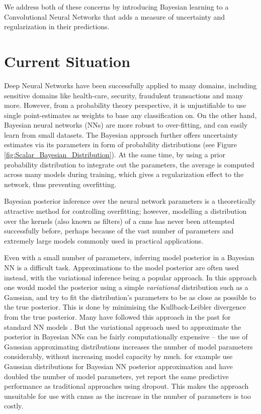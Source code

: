 We address both of these concerns by introducing Bayesian learning to a Convolutional Neural Networks that adds a measure of uncertainty and regularization in their predictions. 

\section{Current Situation}

Deep Neural Networks have been successfully applied to many domains, including sensitive domains like health-care, security, fraudulent transactions and many more. However, from a probability theory perspective, it is unjustifiable to use single point-estimates as weights to base any classification on.
On the other hand, Bayesian neural networks (NNs) are more robust to over-fitting, and can easily learn from small datasets. The Bayesian approach further offers uncertainty estimates via its parameters in form of probability distributions (see Figure \ref{fig:Scalar_Bayesian_Distribution}). At the same time, by using a prior probability distribution to integrate out the parameters, the average is computed across many models during training, which gives a regularization effect to the network, thus preventing overfitting.


Bayesian posterior inference over the neural network parameters is a theoretically attractive method for controlling overfitting; however, modelling a distribution over the kernels (also known as filters) of a \acp{cnn} has never been attempted successfully before, perhaps because of the vast number of parameters and extremely large models commonly used in practical applications.

Even with a small number of parameters, inferring model posterior in a Bayesian NN is a difficult task. Approximations to the model posterior are often used instead, with the variational inference being a popular approach. In this approach one would model the posterior using a simple \textit{variational} distribution such as a Gaussian, and try to fit the distribution's parameters to be as close as possible to the true posterior. This is done by minimising the Kullback-Leibler divergence from the true posterior. Many have followed this approach in the past for standard NN models \citep{hinton1993keeping,barber1998ensemble,graves2011practical,blundell2015weight}.
But the variational approach used to approximate the posterior in Bayesian NNs can be fairly computationally expensive -- the use of Gaussian approximating distributions increases the number of model parameters considerably, without increasing model capacity by much. \citet{blundell2015weight} for example use Gaussian distributions for Bayesian NN posterior approximation and have doubled the number of model parameters, yet report the same predictive performance as traditional approaches using dropout. This makes the approach unsuitable for use with \acp{cnn}s as the increase in the number of parameters is too costly.

